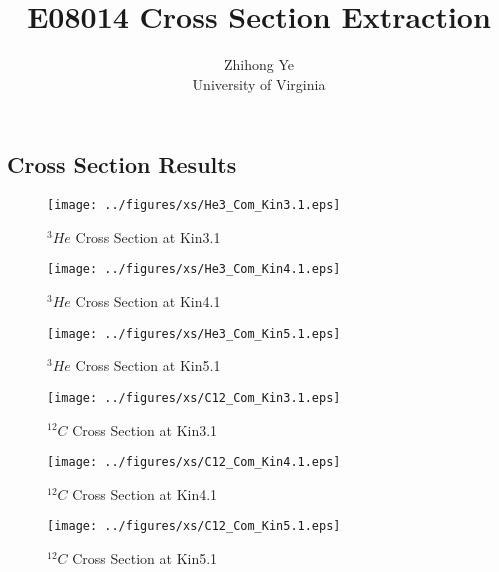 \documentclass[a4paper,10.5pt]{report}
\title{E08014 Cross Section Extraction}
\author{Zhihong Ye\\ University of Virginia}
\begin{document}

\subsection{Cross Section Results}

\begin{figure}[!h]
 \begin{center}
  \texttt{[image: ../figures/xs/He3\_Com\_Kin3.1.eps]}
  \caption[$^{3}He$ Cross Section at Kin3.1]{$^{3}He$ Cross Section at Kin3.1}
  \label{xs_1}
 \end{center}
\end{figure}

\begin{figure}[!h]
 \begin{center}
  \texttt{[image: ../figures/xs/He3\_Com\_Kin4.1.eps]}
  \caption[$^{3}He$ Cross Section at Kin4.1]{$^{3}He$ Cross Section at Kin4.1}
  \label{xs_2}
 \end{center}
\end{figure}

\begin{figure}[!h]
 \begin{center}
  \texttt{[image: ../figures/xs/He3\_Com\_Kin5.1.eps]}
  \caption[$^{3}He$ Cross Section at Kin5.1]{$^{3}He$ Cross Section at Kin5.1}
  \label{xs_3}
 \end{center}
\end{figure}

\begin{figure}[!h]
 \begin{center}
  \texttt{[image: ../figures/xs/C12\_Com\_Kin3.1.eps]}
  \caption[$^{12}C$ Cross Section at Kin3.1]{$^{12}C$ Cross Section at Kin3.1}
  \label{xs_4}
 \end{center}
\end{figure}

\begin{figure}[!h]
 \begin{center}
  \texttt{[image: ../figures/xs/C12\_Com\_Kin4.1.eps]}
  \caption[$^{12}C$ Cross Section at Kin4.1]{$^{12}C$ Cross Section at Kin4.1}
  \label{xs_5}
 \end{center}
\end{figure}

\begin{figure}[!h]
 \begin{center}
  \texttt{[image: ../figures/xs/C12\_Com\_Kin5.1.eps]}
  \caption[$^{12}C$ Cross Section at Kin5.1]{$^{12}C$ Cross Section at Kin5.1}
  \label{xs_6}
 \end{center}
\end{figure}
\end{document}
